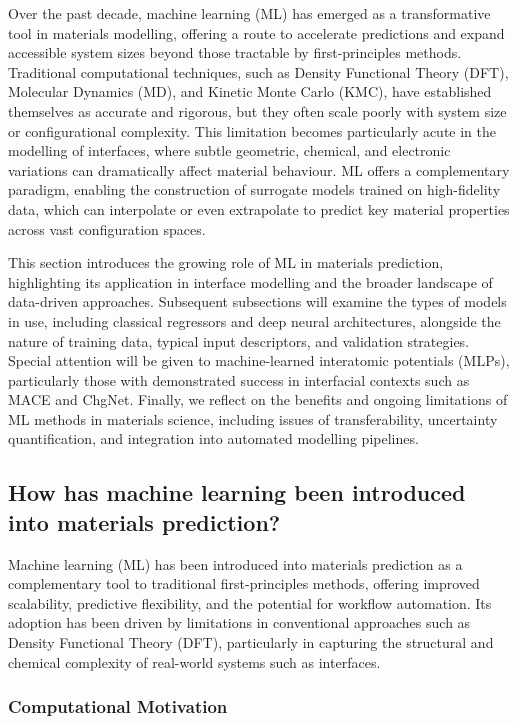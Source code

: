 Over the past decade, machine learning (ML) has emerged as a transformative tool in materials modelling, offering a route to accelerate predictions and expand accessible system sizes beyond those tractable by first-principles methods. Traditional computational techniques, such as Density Functional Theory (DFT), Molecular Dynamics (MD), and Kinetic Monte Carlo (KMC), have established themselves as accurate and rigorous, but they often scale poorly with system size or configurational complexity. This limitation becomes particularly acute in the modelling of interfaces, where subtle geometric, chemical, and electronic variations can dramatically affect material behaviour. ML offers a complementary paradigm, enabling the construction of surrogate models trained on high-fidelity data, which can interpolate or even extrapolate to predict key material properties across vast configuration spaces.

This section introduces the growing role of ML in materials prediction, highlighting its application in interface modelling and the broader landscape of data-driven approaches. Subsequent subsections will examine the types of models in use, including classical regressors and deep neural architectures, alongside the nature of training data, typical input descriptors, and validation strategies. Special attention will be given to machine-learned interatomic potentials (MLPs), particularly those with demonstrated success in interfacial contexts such as MACE and ChgNet. Finally, we reflect on the benefits and ongoing limitations of ML methods in materials science, including issues of transferability, uncertainty quantification, and integration into automated modelling pipelines.

\subsection{How has machine learning been introduced into materials prediction?}

Machine learning (ML) has been introduced into materials prediction as a complementary tool to traditional first-principles methods, offering improved scalability, predictive flexibility, and the potential for workflow automation. Its adoption has been driven by limitations in conventional approaches such as Density Functional Theory (DFT), particularly in capturing the structural and chemical complexity of real-world systems such as interfaces.

\subsubsection{Computational Motivation}

